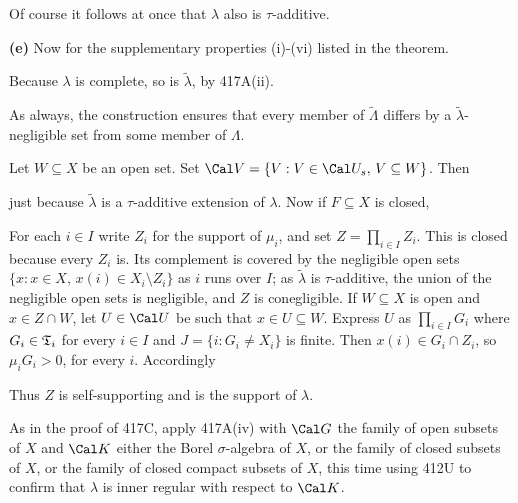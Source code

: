 {Of course it follows at once that $\lambda$ also is $\tau$-additive.

\medskip

{\bf (e)} Now for the supplementary properties (i)-(vi) listed in the
theorem.

\medskip

 Because $\lambda$ is complete, so is
$\tilde\lambda$, by 417A(ii).

\medskip

 As always, the construction ensures that every member of
$\tilde\Lambda$ differs by a $\tilde\lambda$-negligible set from some
member of $\Lambda$.

\medskip

 Let $W\subseteq X$ be an open set.   Set
$\Cal V=\{V:V\in\Cal U_s,\,V\subseteq W\}$.   Then


\noindent just because $\tilde\lambda$ is a $\tau$-additive extension of
$\lambda$.   Now if $F\subseteq X$ is closed,


\medskip

 For each $i\in I$ write $Z_i$ for the support of
$\mu_i$, and set $Z=\prod_{i\in I}Z_i$.   This is closed because every
$Z_i$ is.
Its complement is covered by the negligible open sets
$\{x:x\in X,\,x(i)\in X_i\setminus Z_i\}$ as $i$ runs over $I$;  as
$\tilde\lambda$ is $\tau$-additive, the union of the negligible open sets
is negligible, and $Z$ is conegligible.
If $W\subseteq X$ is open and $x\in Z\cap W$, let $U\in\Cal U$ be such
that $x\in U\subseteq W$.
Express $U$ as $\prod_{i\in I}G_i$ where $G_i\in\frak T_i$ for every
$i\in I$ and $J=\{i:G_i\ne X_i\}$ is finite.   Then
$x(i)\in G_i\cap Z_i$, so $\mu_iG_i>0$, for every $i$.   Accordingly


\noindent Thus $Z$ is self-supporting and is the support of $\lambda$.

\medskip

 As in the proof of 417C, apply 417A(iv) with
$\Cal G$ the family of open subsets of $X$ and $\Cal K$ either the Borel
$\sigma$-algebra of $X$, or the family of closed subsets of $X$, or the
family of closed compact subsets of $X$,
this time using 412U to confirm that
$\lambda$ is inner regular with respect to $\Cal K$.
}%

